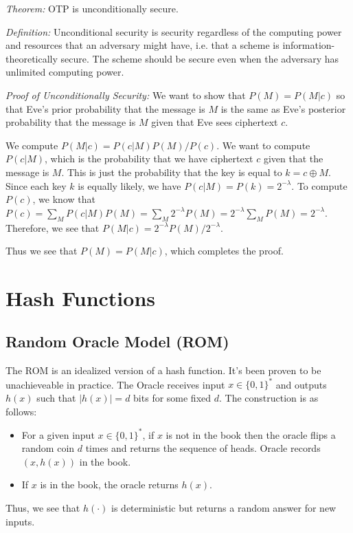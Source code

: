 \documentclass[psamsfonts]{amsart}
\begin{document}
\emph{Theorem:} OTP is unconditionally secure.

\emph{Definition:} Unconditional security is security regardless of the computing power and resources that an adversary might have, i.e. that a scheme is information-theoretically secure. The scheme should be secure even when the adversary has unlimited computing power.

\emph{Proof of Unconditionally Security:} We want to show that $P(M) = P(M | c)$ so that Eve's prior probability that the message is $M$ is the same as Eve's posterior probability that the message is $M$ given that Eve sees ciphertext $c$.

We compute $P(M|c) = P(c|M) P(M) / P(c)$. We want to compute $P(c|M)$, which is the probability that we have ciphertext $c$ given that the message is $M$. This is just the probability that the key is equal to $k = c \oplus M$. Since each key $k$ is equally likely, we have $P(c|M) = P(k) = 2^{-\lambda}$. To compute $P(c)$, we know that $P(c) = \sum_{M} P(c|M) P(M) = \sum_{M} 2^{-\lambda} P(M) = 2^{-\lambda} \sum_{M} P(M) = 2^{-\lambda}$. Therefore, we see that $P(M|c) = 2^{-\lambda} P(M) / 2^{-\lambda}$.

Thus we see that $P(M) = P(M|c)$, which completes the proof.

\newpage

\section{Hash Functions}

\subsection{Random Oracle Model (ROM)}

The ROM is an idealized version of a hash function. It's been proven to be unachieveable in practice. The Oracle receives input $x \in \{0,1\}^*$ and outputs $h(x)$ such that $|h(x)| = d$ bits for some fixed $d$. The construction is as follows:
\begin{itemize}
  \item For a given input $x \in \{0,1\}^*$, if $x$ is not in the book then the oracle flips a random coin $d$ times and returns the sequence of heads. Oracle records $(x, h(x))$ in the book.
  \item If $x$ is in the book, the oracle returns $h(x)$.
\end{itemize}

Thus, we see that $h(\cdot)$ is deterministic but returns a random answer for new inputs.
\end{document}
